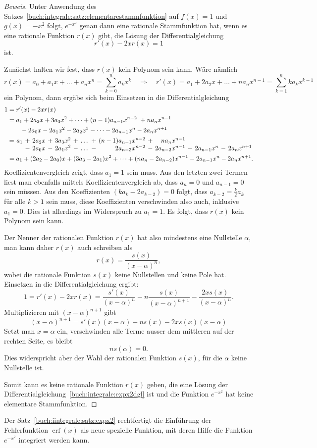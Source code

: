 \begin{proof}[Beweis]
Unter Anwendung des Satzes~\ref{buch:integrale:satz:elementarestammfunktion}
auf $f(x)=1$ und $g(x)=-x^2$ folgt, $e^{-x^2}$ genau dann eine rationale 
Stammfunktion hat, wenn es eine rationale Funktion $r(x)$ gibt, die
Lösung der Differentialgleichung
\begin{equation}
r'(x) -2xr(x)=1
\label{buch:integrale:expx2dgl}
\end{equation}
ist.

Zunächst halten wir fest, dass $r(x)$ kein Polynom sein kann.
Wäre nämlich 
\[
r(x)
=
a_0 + a_1x + \dots + a_nx^n
=
\sum_{k=0}^n a_kx^k
\quad\Rightarrow\quad
r'(x)
=
a_1 + 2a_2x + \dots + na_nx^{n-1}
=
\sum_{k=1}^n
ka_kx^{k-1}
\]
ein Polynom, dann ergäbe sich beim Einsetzen in die Differentialgleichung
\begin{align*}
1
&=
r'(x)-2xr(x)
\\
&=
a_1 + 2a_2x + 3a_3x^2 + \dots + (n-1)a_{n-1}x^{n-2} + na_nx^{n-1}
\\
&\qquad
-
2a_0x -2a_1x^2 -2a_2x^3 - \dots - 2a_{n-1}x^n - 2a_nx^{n+1}
\\
&
\hspace{0.7pt}
\renewcommand{\arraycolsep}{1.8pt}
\begin{array}{crcrcrcrcrcrcrcr}
=&a_1&+&2a_2x&+&3a_3x^2&+&\dots&+&(n-1)a_{n-1}x^{n-2}&+&na_{n  }x^{n-1}& &           & & \\
 &   &-&2a_0x&-&2a_1x^2&-&\dots&-&    2a_{n-3}x^{n-2}&-&2a_{n-2}x^{n-1}&-&2a_{n-1}x^n&-&2a_nx^{n+1}
\end{array}
\\
&=
a_1
+
(2a_2-2a_0)x
+
(3a_3-2a_1)x^2
+
\dots
+
(na_n-2a_{n-2})x^{n-1}
-
2a_{n-1}x^n
-
2a_nx^{n+1}.
\end{align*}
Koeffizientenvergleich zeigt, dass $a_1=1$ sein muss.
Aus den letzten zwei Termen liest man ebenfalls mittels Koeffizientenvergleich
ab, dass $a_n=0$ und $a_{n-1}=0$ sein müssen.
Aus den Koeffizienten $(ka_k-2a_{k-2})=0$ folgt, dass
$a_{k-2}=\frac{k}{2}a_k$ für alle $k>1$ sein muss, diese Koeffizienten
verschwinden also auch, inklusive $a_1=0$.
Dies ist allerdings im Widerspruch zu $a_1=1$.
Es folgt, dass $r(x)$ kein Polynom sein kann.

Der Nenner der rationalen Funktion $r(x)$ hat also mindestens eine Nullstelle
$\alpha$, man kann daher $r(x)$ auch schreiben als
\[
r(x) = \frac{s(x)}{(x-\alpha)^n},
\]
wobei die rationale Funktion $s(x)$ keine Nullstellen und keine Pole hat.
Einsetzen in die Differentialgleichung ergibt:
\[
1
=
r'(x) -2xr(x)
=
\frac{s'(x)}{(x-\alpha)^n}
-n
\frac{s(x)}{(x-\alpha)^{n+1}}
-
\frac{2xs(x)}{(x-\alpha)^n}.
\]
Multiplizieren mit $(x-\alpha)^{n+1}$ gibt
\[
(x-\alpha)^{n+1}
=
s'(x)(x-\alpha)
-
ns(x)
-
2xs(x)(x-\alpha)
\]
Setzt man $x=\alpha$ ein, verschwinden alle Terme ausser dem mittleren
auf der rechten Seite, es bleibt
\[
ns(\alpha) = 0.
\]
Dies widerspricht aber der Wahl der rationalen Funktion $s(x)$, für die
$\alpha$ keine Nullstelle ist.

Somit kann es keine rationale Funktion $r(x)$ geben, die eine Lösung der
Differentialgleichung~\eqref{buch:integrale:expx2dgl} ist und
die Funktion $e^{-x^2}$ hat keine elementare Stammfunktion.
\end{proof}

Der Satz~\ref{buch:iintegrale:satz:expx2} rechtfertigt die Einführung 
der Fehlerfunktion $\operatorname{erf}(x)$ als neue spezielle Funktion,
mit deren Hilfe die Funktion $e^{-x^2}$ integriert werden kann.



